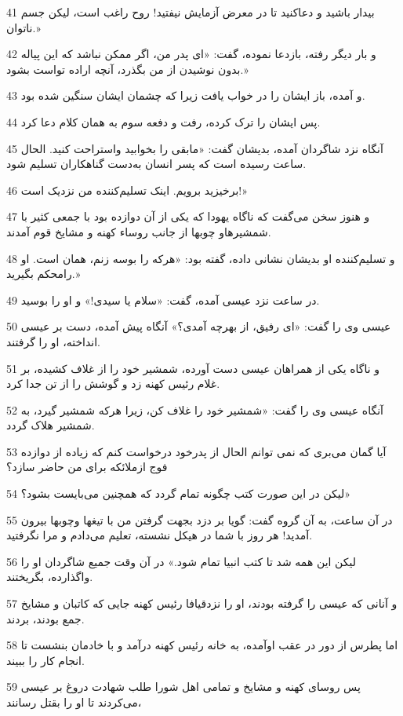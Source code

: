\par 41 بیدار باشید و دعاکنید تا در معرض آزمایش نیفتید! روح راغب است، لیکن جسم ناتوان.»
\par 42 و بار دیگر رفته، بازدعا نموده، گفت: «ای پدر من، اگر ممکن نباشد که این پیاله بدون نوشیدن از من بگذرد، آنچه اراده تواست بشود.»
\par 43 و آمده، باز ایشان را در خواب یافت زیرا که چشمان ایشان سنگین شده بود.
\par 44 پس ایشان را ترک کرده، رفت و دفعه سوم به همان کلام دعا کرد.
\par 45 آنگاه نزد شاگردان آمده، بدیشان گفت: «مابقی را بخوابید واستراحت کنید. الحال ساعت رسیده است که پسر انسان به‌دست گناهکاران تسلیم شود.
\par 46 برخیزید برویم. اینک تسلیم‌کننده من نزدیک است!»
\par 47 و هنوز سخن می‌گفت که ناگاه یهودا که یکی از آن دوازده بود با جمعی کثیر با شمشیرهاو چوبها از جانب روساء کهنه و مشایخ قوم آمدند.
\par 48 و تسلیم‌کننده او بدیشان نشانی داده، گفته بود: «هر‌که را بوسه زنم، همان است. او رامحکم بگیرید.»
\par 49 در ساعت نزد عیسی آمده، گفت: «سلام یا سیدی!» و او را بوسید.
\par 50 عیسی وی را گفت: «ای رفیق، از بهر‌چه آمدی؟» آنگاه پیش آمده، دست بر عیسی انداخته، او را گرفتند.
\par 51 و ناگاه یکی از همراهان عیسی دست آورده، شمشیر خود را از غلاف کشیده، بر غلام رئیس کهنه زد و گوشش را از تن جدا کرد.
\par 52 آنگاه عیسی وی را گفت: «شمشیر خود را غلاف کن، زیرا هر‌که شمشیر گیرد، به شمشیر هلاک گردد.
\par 53 آیا گمان می‌بری که نمی توانم الحال از پدرخود درخواست کنم که زیاده از دوازده فوج ازملائکه برای من حاضر سازد؟
\par 54 لیکن در این صورت کتب چگونه تمام گردد که همچنین می‌بایست بشود؟»
\par 55 در آن ساعت، به آن گروه گفت: گویا بر دزد بجهت گرفتن من با تیغها وچوبها بیرون آمدید! هر روز با شما در هیکل نشسته، تعلیم می‌دادم و مرا نگرفتید.
\par 56 لیکن این همه شد تا کتب انبیا تمام شود.» در آن وقت جمیع شاگردان او را واگذارده، بگریختند.
\par 57 و آنانی که عیسی را گرفته بودند، او را نزدقیافا رئیس کهنه جایی که کاتبان و مشایخ جمع بودند، بردند.
\par 58 اما پطرس از دور در عقب اوآمده، به خانه رئیس کهنه در‌آمد و با خادمان بنشست تا انجام کار را ببیند.
\par 59 پس روسای کهنه و مشایخ و تمامی اهل شورا طلب شهادت دروغ بر عیسی می‌کردند تا او را بقتل رسانند،
